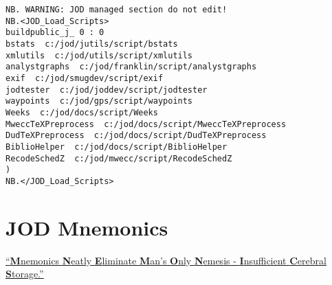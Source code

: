\begin{lstlisting}[frame=single,framerule=0pt,basicstyle=\ttfamily\footnotesize]   
NB. WARNING: JOD managed section do not edit!
NB.<JOD_Load_Scripts>
buildpublic_j_ 0 : 0
bstats  c:/jod/jutils/script/bstats
xmlutils  c:/jod/utils/script/xmlutils
analystgraphs  c:/jod/franklin/script/analystgraphs
exif  c:/jod/smugdev/script/exif
jodtester  c:/jod/joddev/script/jodtester
waypoints  c:/jod/gps/script/waypoints
Weeks  c:/jod/docs/script/Weeks
MweccTeXPreprocess  c:/jod/docs/script/MweccTeXPreprocess
DudTeXPreprocess  c:/jod/docs/script/DudTeXPreprocess
BiblioHelper  c:/jod/docs/script/BiblioHelper
RecodeSchedZ  c:/jod/mwecc/script/RecodeSchedZ
)
NB.</JOD_Load_Scripts>
\end{lstlisting}

\newpage


\newpage

  
\newpage


\newpage
\section{JOD Mnemonics}

\large
\itshape
  
\href{http://www.acronymfinder.com/Mnemonics-Neatly-Eliminate-Man's-Only-Nemesis-_-Insufficient-Cerebral-Storage-(MNEMONICS).html}{``\textbf{M}nemonics \textbf{N}eatly \textbf{E}liminate \textbf{M}an's \textbf{O}nly \textbf{N}emesis - \textbf{I}nsufficient \textbf{C}erebral \textbf{S}torage.''}

\Large

